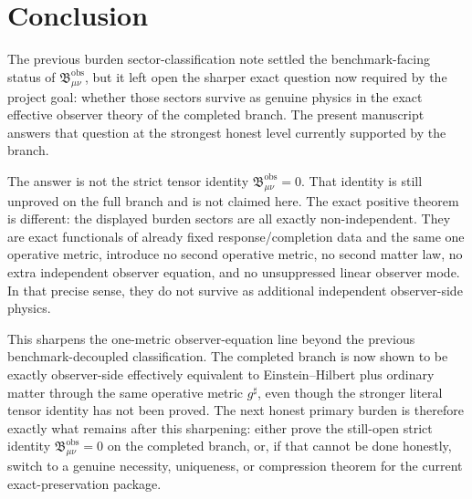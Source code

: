 \documentclass[11pt]{article}
\newcommand{\CompletedMetric}{g^{\sharp}}
\newcommand{\ObsBurden}{\mathfrak B_{\mu\nu}^{\mathrm{obs}}}
\begin{document}
\section{Conclusion}

The previous burden sector-classification note settled the benchmark-facing status of \(\ObsBurden\), but it left open the sharper exact question now required by the project goal: whether those sectors survive as genuine physics in the exact effective observer theory of the completed branch. The present manuscript answers that question at the strongest honest level currently supported by the branch.

The answer is not the strict tensor identity \(\ObsBurden=0\). That identity is still unproved on the full branch and is not claimed here. The exact positive theorem is different: the displayed burden sectors are all exactly non-independent. They are exact functionals of already fixed response/completion data and the same one operative metric, introduce no second operative metric, no second matter law, no extra independent observer equation, and no unsuppressed linear observer mode. In that precise sense, they do not survive as additional independent observer-side physics.

This sharpens the one-metric observer-equation line beyond the previous benchmark-decoupled classification. The completed branch is now shown to be exactly observer-side effectively equivalent to Einstein--Hilbert plus ordinary matter through the same operative metric \(\CompletedMetric\), even though the stronger literal tensor identity has not been proved. The next honest primary burden is therefore exactly what remains after this sharpening: either prove the still-open strict identity \(\ObsBurden=0\) on the completed branch, or, if that cannot be done honestly, switch to a genuine necessity, uniqueness, or compression theorem for the current exact-preservation package.
\end{document}
